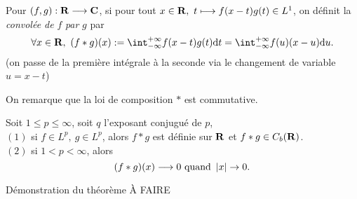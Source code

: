 \documentclass[a4paper,11pt, twoside]{article}
\begin{document}

\begin{Def}
  Pour $(f,g):\mathbf R\longrightarrow\mathbf C$, si pour tout $x\in \mathbf R,\ t\longmapsto f(x-t)g(t)\in L^1$, on définit la \emph{convolée de }$f$\emph{ par }$g$ par 
  $$\forall x\in\R,\ (f*g)(x):=\int_{-\infty}^{+\infty}f(x-t)g(t)\dt=\int_{-\infty}^{+\infty}f(u)(x-u)\mathrm du.$$
  (on passe de la première intégrale à la seconde via le changement de variable $u=x-t$)
\end{Def}


\begin{RQ}
  On remarque que la loi de composition $*$ est commutative.
\end{RQ}


\begin{Th}
  Soit $1\leqslant p\leqslant \infty$, soit $q$ l'exposant conjugué de $p$,\\

  $(\mathit 1)$ si $f\in L^p,\ g\in L^p$, alors $f*g$ est définie sur $\mathbf R$ et $f*g\in C_b(\mathbf R)$.\\
  $(\mathit 2)$ si $1<p< \infty$, alors 
  $$(f*g)(x)\longrightarrow 0\text{ quand }\left| x\right|\to 0.$$ 
\end{Th}


\begin{Proof}{Démonstration du théorème}
  À FAIRE
\end{Proof}
\end{document}
